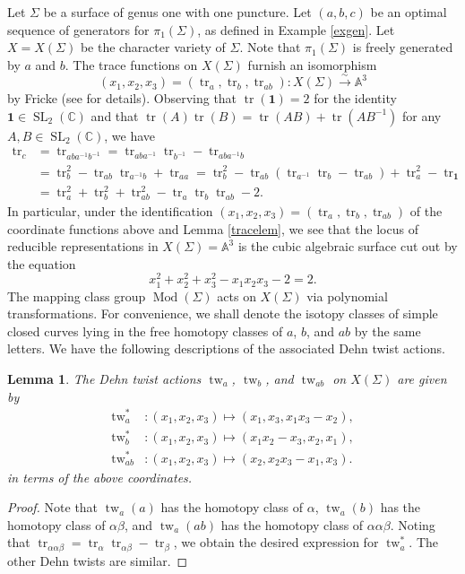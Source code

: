 \documentclass[reqno]{amsart}
\theoremstyle{plain}
\newtheorem{lemma}[theorem]{Lemma}
\theoremstyle{definition}
\theoremstyle{remark}
\newcommand{\A}{{\mathbb{A}}}
\newcommand{\C}{{\mathbb{C}}}
\DeclareMathOperator{\Mod}{Mod}
\DeclareMathOperator{\SL}{SL}
\DeclareMathOperator{\tw}{tw}
\DeclareMathOperator{\tr}{tr}
\begin{document}
Let $\Sigma$ be a surface of genus one with one puncture. Let $(a,b,c)$ be an optimal sequence of generators for $\pi_1(\Sigma)$, as defined in Example \ref{exgen}. Let $X=X(\Sigma)$ be the character variety of $\Sigma$. Note that $\pi_1(\Sigma)$ is freely generated by $a$ and $b$. The trace functions on $X(\Sigma)$ furnish an isomorphism
$$(x_1,x_2,x_3)=(\tr_{a},\tr_{b},\tr_{ab}):X(\Sigma)\xrightarrow{\sim}\A^3$$
by Fricke (see \cite{goldman2} for details). Observing that $\tr(\mathbf1)=2$ for the identity $\mathbf1\in\SL_2(\C)$ and that $\tr(A)\tr(B)=\tr(AB)+\tr(AB^{-1})$ for any $A,B\in\SL_2(\C)$, we have
\begin{align*}
\tr_c&=\tr_{aba^{-1}b^{-1}}=\tr_{aba^{-1}}\tr_{b^{-1}}-\tr_{aba^{-1}b}\\
&=\tr_{b}^2-\tr_{ab}\tr_{a^{-1}b}+\tr_{aa}=\tr_{b}^2-\tr_{ab}(\tr_{a^{-1}}\tr_{b}-\tr_{ab})+\tr_{a}^2-\tr_{\mathbf1}\\
&=\tr_{a}^2+\tr_{b}^2+\tr_{ab}^2-\tr_{a}\tr_{b}\tr_{ab}-2.
\end{align*}
In particular, under the identification $(x_1,x_2,x_3)=(\tr_{a},\tr_{b},\tr_{ab})$ of the coordinate functions above and Lemma \ref{tracelem}, we see that the locus of reducible representations in $X(\Sigma)=\A^3$ is the cubic algebraic surface cut out by the equation
$$x_1^2+x_2^2+x_3^2-x_1x_2x_3-2=2.$$
The mapping class group $\Mod(\Sigma)$ acts on $X(\Sigma)$ via polynomial transformations.  For convenience, we shall denote the isotopy classes of simple closed curves lying in the free homotopy classes of $a$, $b$, and $ab$ by the same letters. We have the following descriptions of the associated Dehn twist actions.

\begin{lemma}
\label{dehnt}
The Dehn twist actions $\tw_a$, $\tw_b$, and $\tw_{ab}$ on $X(\Sigma)$ are given by
\begin{align*}
\tw_{a}^*&:(x_1,x_2,x_3)\mapsto (x_1,x_3,x_1x_3-x_2),\\
\tw_{b}^*&:(x_1,x_2,x_3)\mapsto (x_1x_2-x_3,x_2,x_1),\\
\tw_{ab}^*&:(x_1,x_2,x_3)\mapsto(x_2,x_2x_3-x_1,x_3).
\end{align*}
in terms of the above coordinates.
\end{lemma}

\begin{proof}
Note that $\tw_a(a)$ has the homotopy class of $\alpha$, $\tw_a(b)$ has the homotopy class of $\alpha\beta$, and $\tw_a(ab)$ has the homotopy class of $\alpha\alpha\beta$. Noting that $\tr_{\alpha\alpha\beta}=\tr_{\alpha}\tr_{\alpha\beta}-\tr_{\beta}$, we obtain the desired expression for $\tw_a^*$. The other Dehn twists are similar.
\end{proof}
\end{document}
